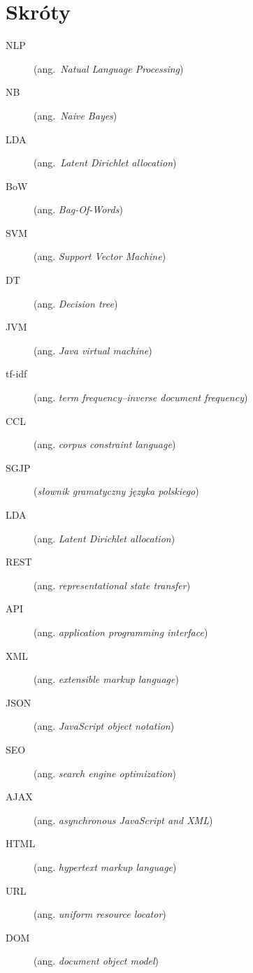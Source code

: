 \chapter*{Skróty}\mbox{}
\label{sec:skroty}
\noindent
\begin{description}
  \item [NLP] (ang.\ \emph{Natual Language Processing})
  \item [NB] (ang.\ \emph{Naive Bayes})
  \item [LDA] (ang.\ \emph{Latent Dirichlet allocation})
  \item [BoW] (ang. \emph{Bag-Of-Words})
  \item [SVM] (ang. \emph{Support Vector Machine})
    \item [DT] (ang. \emph{Decision tree})
       \item [JVM] (ang. \emph{Java virtual machine})
 \item [tf-idf] (ang. \emph{term frequency–inverse document frequency})
  \item [CCL] (ang. \emph{corpus constraint language})
  \item [SGJP] (\emph{słownik gramatyczny języka polskiego})
   \item [LDA] (ang. \emph{Latent Dirichlet allocation}) 
  
  
  
    \item [REST] (ang. \emph{representational state transfer})
        \item [API] (ang. \emph{application programming interface})
      \item [XML] (ang. \emph{extensible markup language})  
\item [JSON] (ang. \emph{JavaScript object notation})
\item [SEO] (ang. \emph{search engine optimization})
\item [AJAX] (ang. \emph{asynchronous JavaScript and XML})
\item [HTML] (ang. \emph{hypertext markup language})
\item [URL] (ang. \emph{uniform resource locator})
\item [DOM] (ang. \emph{document object model})
      
      
      
       
      
      
        
       
\end{description}